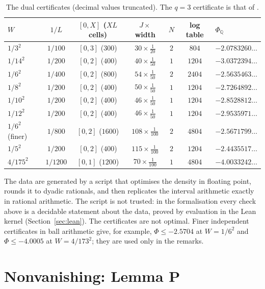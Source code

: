 \documentclass[11pt]{amsart}
\theoremstyle{definition}
\theoremstyle{remark}
\numberwithin{equation}{section}
\begin{document}
\begin{table}[ht]
\centering\small
\begin{tabular}{@{}lcccccl@{}}
\toprule
$W$ & $1/L$ & $[0,X]$ ($XL$ cells) & $J\times$ width & $N$ & log table & $\Phi_{\mathbb Q}$\\
\midrule
$1/3^2$ & $1/100$ & $[0,3]$ ($300$) & $30\times\frac1{20}$ & $2$ & $804$ & $-2.0783260\ldots$\\
$1/14^2$ & $1/200$ & $[0,2]$ ($400$) & $40\times\frac1{50}$ & $1$ & $1204$ & $-3.0372394\ldots$\\
$1/6^2$ & $1/400$ & $[0,2]$ ($800$) & $54\times\frac1{50}$ & $2$ & $2404$ & $-2.5635463\ldots$\\
$1/8^2$ & $1/200$ & $[0,2]$ ($400$) & $50\times\frac1{50}$ & $1$ & $1204$ & $-2.7264892\ldots$\\
$1/10^2$ & $1/200$ & $[0,2]$ ($400$) & $46\times\frac1{50}$ & $1$ & $1204$ & $-2.8528812\ldots$\\
$1/12^2$ & $1/200$ & $[0,2]$ ($400$) & $46\times\frac1{50}$ & $1$ & $1204$ & $-2.9535971\ldots$\\
$1/6^2$ (finer) & $1/800$ & $[0,2]$ ($1600$) & $108\times\frac1{100}$ & $2$ & $4804$ & $-2.5671799\ldots$\\
$1/5^2$ & $1/200$ & $[0,2]$ ($400$) & $115\times\frac1{100}$ & $2$ & $1204$ & $-2.4435517\ldots$\\
$4/175^2$ & $1/1200$ & $[0,1]$ ($1200$) & $70\times\frac1{100}$ & $1$ & $4804$ & $-4.0033242\ldots$\\
\bottomrule
\end{tabular}
\caption{The dual certificates (decimal values truncated). The $q=3$ certificate is that of \cite{Chi2Paper}.}\label{tab:cert}
\end{table}

The data are generated by a script that optimises the density in floating point, rounds it to dyadic rationals, and
then replicates the interval arithmetic exactly in rational arithmetic. The script is not trusted: in the formalisation
every check above is a decidable statement about the data, proved by evaluation in the Lean kernel
(Section~\ref{sec:lean}). The certificates are not optimal. Finer independent certificates in ball arithmetic give,
for example, $\Phi\le-2.5704$ at $W=1/6^2$ and $\Phi\le-4.0005$ at $W=4/173^2$; they are used only in the remarks.

\section{Nonvanishing: Lemma P}\label{sec:nonvan}
\end{document}
